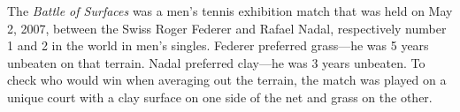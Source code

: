 The \emph{Battle of Surfaces} was a men's tennis exhibition match that was held on May 2, 2007, between the Swiss Roger Federer and Rafael Nadal, respectively
number 1 and 2 in the world in men's singles. Federer preferred grass---he was 5 years unbeaten on that terrain. Nadal preferred clay---he was 3 years unbeaten.
To check who would win when averaging out the terrain, the match was played on a unique court with a clay surface on one side of the net and grass on the other.
